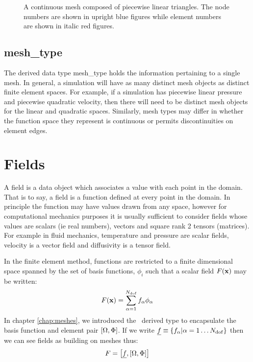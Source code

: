 \documentclass[a4paper, 11pt]{book}
\newcommand{\ifhtlatex}[2]{\ifthenelse{\boolean{HTLatex}}{#1}{#2}}
\newcommand{\targetlabel}[1]{\hypertarget{#1}{}\label{#1}}
\newcommand{\xfig}[1]{
  \ifhtlatex{
    \texttt{[image: \#1.png]}
  }{
    
  }
}
\begin{document}
\begin{figure}[t]
  \centering
  \xfig{mesh}
  \caption{A continuous mesh composed of piecewise linear triangles. The
    node numbers are shown in upright blue figures while element numbers are
  shown in italic red figures.}
  \label{fig:meshnumbering}
\end{figure}



\section{mesh\_type}\targetlabel{type:mesh}

The derived data type mesh\_type holds the information pertaining to a
single mesh. In general, a simulation will have as many distinct mesh
objects as distinct finite element spaces. For example, if a simulation has
piecewise linear pressure and piecewise quadratic velocity, then there will
need to be distinct mesh objects for the linear and quadratic
spaces. Similarly, mesh types may differ in whether the function space they
represent is continuous or permits discontinuities on element edges.


\chapter{Fields}

A field is a data object which associates a value with each point in the
domain. That is to say, a field is a function defined at every point in the
domain. In principle the function may have values drawn from any space,
however for computational mechanics purposes it is usually sufficient to
consider fields whose values are scalars (ie real numbers), vectors and
square rank 2 tensors (matrices). For example in fluid mechanics,
temperature and pressure are scalar fields, velocity is a vector field and
diffusivity is a tensor field.

In the finite element method, functions are restricted to a
finite dimensional space spanned by the set of basis functions, $\phi_i$
such that a scalar field $F(\mathbf{x})$ may be written:
\begin{equation}
  F(\mathbf{x})=\sum_{\alpha=1}^{N_\mathrm{dof}} f_\alpha\phi_\alpha
\end{equation}
In chapter \ref{chap:meshes}, we introduced the \meshtype\ derived type to
encapsulate the basis function and element pair $[\Omega,\Phi]$. If we write
$\underline{f}\equiv \{f_\alpha|\alpha=1\ldots N_\mathrm{dof}\}$ then we can see fields as building on
meshes thus:
\begin{equation}\label{eq:scalarfield}
  F=\left[\underline{f},[\Omega,\Phi]\right]
\end{equation}
\end{document}
